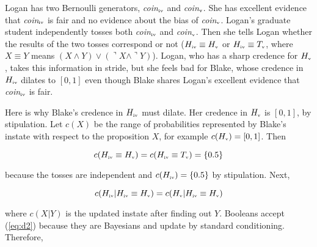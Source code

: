\documentclass[11pt]{article}
\begin{document}
\begin{quotex}
  \label{ex:dilation} Logan has two Bernoulli
  generators, \textit{coin}$_{\mbox{\tiny{iv}}}$ and
  \textit{coin}$_{\mbox{\tiny{v}}}$. She has excellent evidence that
  \textit{coin}$_{\mbox{\tiny{iv}}}$ is fair and no evidence about the
  bias of \textit{coin}$_{\mbox{\tiny{v}}}$. Logan's graduate student
  independently tosses both \textit{coin}$_{\mbox{\tiny{iv}}}$ and
  \textit{coin}$_{\mbox{\tiny{v}}}$. Then she tells Logan whether the
  results of the two tosses correspond or not
  ($H_{\mbox{\tiny{iv}}}\equiv{}H_{\mbox{\tiny{v}}}$ or
  $H_{\mbox{\tiny{iv}}}\equiv{}T_{\mbox{\tiny{v}}}$, where
  $X\equiv{}Y$ means
  $(X\wedge{}Y)\vee(\urcorner{}X\wedge\urcorner{}Y)$). Logan, who has
  a sharp credence for $H_{\mbox{\tiny{v}}}$, takes this information
  in stride, but she feels bad for Blake, whose credence in
  $H_{\mbox{\tiny{iv}}}$ dilates to $[0,1]$ even though Blake shares
  Logan's excellent evidence that \textit{coin}$_{\mbox{\tiny{iv}}}$
  is fair.
\end{quotex}

Here is why Blake's credence in $H_{\mbox{\tiny{iv}}}$ must dilate.
Her credence in $H_{\mbox{\tiny{v}}}$ is $[0,1]$, by stipulation. Let
$c(X)$ be the range of probabilities represented by Blake's instate
with respect to the proposition $X$, for example
$c(H_{\mbox{\tiny{v}}})=[0,1]$. Then

\begin{equation}
  \label{eq:d1}
  c(H_{\mbox{\tiny{iv}}}\equiv{}H_{\mbox{\tiny{v}}})=c(H_{\mbox{\tiny{iv}}}\equiv{}T_{\mbox{\tiny{v}}})=\{0.5\}
\end{equation}

because the tosses are independent and
$c(H_{\mbox{\tiny{iv}}})=\{0.5\}$ by stipulation. Next,

\begin{equation}
  \label{eq:d2}
  c(H_{\mbox{\tiny{iv}}}|H_{\mbox{\tiny{iv}}}\equiv{}H_{\mbox{\tiny{v}}})=c(H_{\mbox{\tiny{v}}}|H_{\mbox{\tiny{iv}}}\equiv{}H_{\mbox{\tiny{v}}})
\end{equation}

where $c(X|Y)$ is the updated instate after finding out $Y$. Booleans
accept (\ref{eq:d2}) because they are Bayesians and update by standard
conditioning. Therefore,

\end{document}
